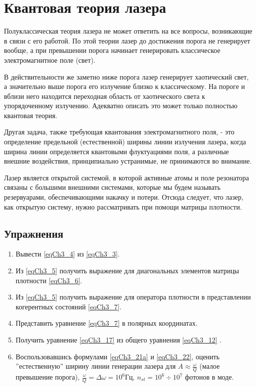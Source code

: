 \chapter{Квантовая теория лазера}
\label{chLaser}

Полуклассическая теория лазера не может ответить на все вопросы,
возникающие в связи с его работой. По этой теории лазер до достижения
порога  не генерирует вообще, а при превышении порога начинает
генерировать классическое электромагнитное поле (свет). 

В действительности же заметно ниже порога лазер генерирует хаотический
свет, а значительно выше порога его излучение близко к
классическому. На пороге и вблизи него находится переходная область от
хаотического света к упорядоченному излучению. Адекватно описать это
может только полностью квантовая теория. 

Другая задача, также требующая квантования электромагнитного поля, -
это определение предельной (естественной) ширины линии излучения
лазера, когда ширина линии определяется квантовыми флуктуациями поля,
а различные внешние воздействия, принципиально устранимые, не
принимаются во внимание. 

Лазер является открытой системой, в которой активные атомы и поле
резонатора связаны с большими внешними системами, которые мы будем
называть резервуарами, обеспечивающими накачку и потери. 
Отсюда следует, что лазер, как открытую систему, нужно рассматривать
при помощи матрицы плотности.  






\section{Упражнения}
\begin{enumerate}
\item Вывести \eqref{eqCh3_4} из \eqref{eqCh3_3}.
\item Из \eqref{eqCh3_5} получить выражение для диагональных элементов
  матрицы плотности \eqref{eqCh3_6}.
\item Из \eqref{eqCh3_5} получить выражение для оператора плотности в
  представлении когерентных состояний \eqref{eqCh3_7}.
\item Представить уравнение \eqref{eqCh3_7} в полярных координатах.
\item Получить уравнение \eqref{eqCh3_17} из общего уравнения
  \eqref{eqCh3_12} .
\item Воспользовавшись формулами \eqref{eqCh3_21a} и \eqref{eqCh3_22},
  оценить ''естественную'' ширину линии генерации лазера для $A
  \approx \frac{\omega}{Q}$ (малое превышение порога), 
$\frac{\omega}{Q} = \Delta \omega = 10^6 \mbox{Гц}$, 
$n_{st} = 10^6 \div 10^7$ фотонов в моде. 
\end{enumerate}

